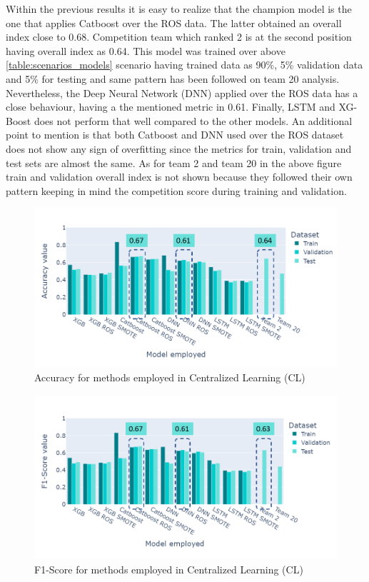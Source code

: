 Within the previous results it is easy to realize that the champion model is the one that applies Catboost over the ROS data. The latter obtained an overall index close to 0.68. Competition team which ranked 2 is at the second position having overall index as 0.64. This model was trained over above \ref{table:scenarios_models} scenario having trained data as 90\%, 5\% validation data and 5\% for testing and same pattern has been followed on team 20 analysis. Nevertheless, the Deep Neural Network (DNN) applied over the ROS data has a close behaviour, having a the mentioned metric in 0.61. Finally, LSTM and XG-Boost does not perform that well compared to the other models. An additional point to mention is that both Catboost and DNN used over the ROS dataset does not show any sign of overfitting since the metrics for train, validation and test sets are almost the same. As for team 2 and team 20 in the above figure train and validation overall index is not shown because they followed their own pattern keeping in mind the competition score during training and validation. 

\begin{figure}[H]
\centering
\includegraphics[scale=0.55]{img/cl_accuracy_methods.png}
\caption{Accuracy for methods employed in Centralized Learning (CL)}
\label{fig:cl_accuracy_methods}
\end{figure}

\begin{figure}[H]
\centering
\includegraphics[scale=0.55]{img/cl_f1score_methods.png}
\caption{F1-Score for methods employed in Centralized Learning (CL)}
\label{fig:cl_f1score_methods}
\end{figure}

